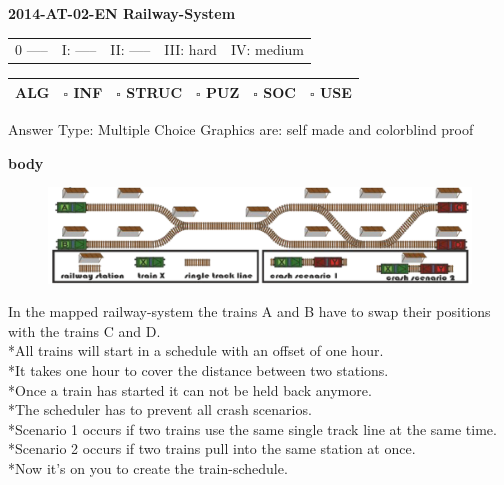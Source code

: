 \documentclass[8pt]{article}
\title{}
\author{}
\date{}
\begin{document}
	
\begin{center}
	\Huge{\textbf{2014-AT-02-EN Railway-System}}
	
	\begin{table}[htbp]
		\begin{center}
			\begin{tabular}{|p{3cm}|p{3cm}|p{3cm}| p{3cm}| p{3cm}|}
				\hline 
				0  ----- & I:  -----  & II:  ----- & III: hard & IV: medium \\
				
			\end{tabular}
			\begin{tabular}{|p{2.48cm}|p{2.4cm}|p{2.4cm}| p{2.4cm}| p{2.4cm}| p{2.48cm} |}
				\hline 
		[X]	ALG	& $\square$ INF  & $\square$ STRUC  & $\square$ PUZ  &  $\square$ SOC  & $\square$ USE  \\
				\hline
			\end{tabular}
		\end{center}
	\end{table}
\end{center}
\vspace{-.8cm}
\normalsize{Answer Type: Multiple Choice Graphics are: self made and colorblind proof}

\begin{center}
	\hline \hline
\end{center}
		
		  \setlength{\parindent}{0cm}
		\huge{\textbf{body}}
		\begin{figure}[htbp]
			\centering
			\includegraphics[scale=.5]{body.png}
		\end{figure}
	
	\large{
	In the mapped railway-system the trains A and B have to swap their positions with the
	trains C and D.
	\\*All trains will start in a schedule with an offset of one hour.
	\\*It takes one hour to cover the distance between two stations.
	\\*Once a train has started it can not be held back anymore.
	\\*The scheduler has to prevent all crash scenarios.
	\\*Scenario 1 occurs if two trains use the same single track line at the same time.
	\\*Scenario 2 occurs if two trains pull into the same station at once.
	\\*Now it's on you to create the train-schedule.}
\end{document}
